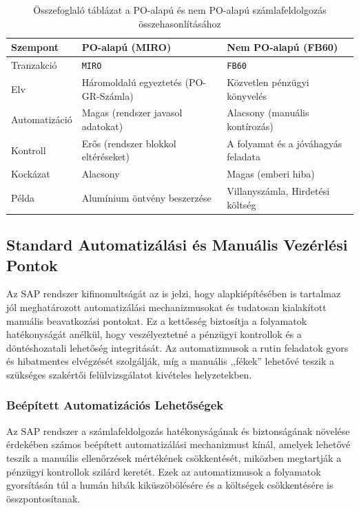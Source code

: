 \begin{table}[H]
    \begin{tabular}{|p{}|p{}|p{}|}
        \hline
        \textbf{Szempont} & \textbf{PO-alapú (MIRO)} & \textbf{Nem PO-alapú (FB60)} \\
        \hline
        Tranzakció & \texttt{MIRO} & \texttt{FB60} \\
        \hline
        Elv & Háromoldalú egyeztetés (PO-GR-Számla) & Közvetlen pénzügyi könyvelés \\
        \hline
        Automatizáció & Magas (rendszer javasol adatokat) & Alacsony (manuális kontírozás) \\
        \hline
        Kontroll & Erős (rendszer blokkol eltéréseket) & A folyamat és a jóváhagyás feladata \\
        \hline
        Kockázat & Alacsony & Magas (emberi hiba) \\
        \hline
        Példa & Alumínium öntvény beszerzése & Villanyszámla, Hirdetési költség \\
        \hline
    \end{tabular}
    \centering
    \caption{Összefoglaló táblázat a PO-alapú és nem PO-alapú számlafeldolgozás összehasonlításához}
    \label{tab:invoice-processing-comparison}
\end{table}

\subsection{Standard Automatizálási és Manuális Vezérlési Pontok}

Az SAP rendszer kifinomultságát az is jelzi, hogy alapkiépítésében is tartalmaz jól meghatározott automatizálási mechanizmusokat és tudatosan kialakított manuális beavatkozási pontokat.
Ez a kettősség biztosítja a folyamatok hatékonyságát anélkül, hogy veszélyeztetné a pénzügyi kontrollok és a döntéshozatali lehetőség integritását.
Az automatizmusok a rutin feladatok gyors és hibatmentes elvégzését szolgálják, míg a manuális ,,fékek'' lehetővé teszik a szükséges szakértői felülvizsgálatot kivételes helyzetekben.

\subsubsection{Beépített Automatizációs Lehetőségek} \label{sssec:beepitett_auto}

Az SAP rendszer a számlafeldolgozás hatékonyságának és biztonságának növelése érdekében számos beépített automatizálási mechanizmust kínál, amelyek lehetővé teszik a manuális ellenőrzések mértékének csökkentését, miközben megtartják a pénzügyi kontrollok szilárd keretét.
Ezek az automatizmusok a folyamatok gyorsításán túl a humán hibák kiküszöbölésére és a költségek csökkentésére is összpontosítanak.


